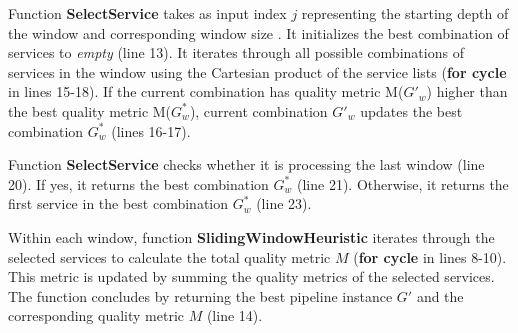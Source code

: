 Function \textbf{SelectService} takes as input index $j$ representing the starting depth of the window and corresponding window size \windowsize. It initializes the best combination of services to \textit{empty} (line 13). It iterates through all possible combinations of services in the window using the Cartesian product of the service lists (\textbf{for cycle} in lines 15-18). If the current combination has quality metric M($G'_w$) higher than the best quality metric M($G^*_w$), current combination $G'_w$ updates the best combination $G^*_w$ (lines 16-17).

Function \textbf{SelectService} checks whether it is processing the last window (line 20). If yes, it returns the best combination $G^*_w$ (line 21). Otherwise, it returns the first service in the best combination $G^*_w$ (line 23).

Within each window, function \textbf{SlidingWindowHeuristic} iterates through the selected services to calculate the total quality metric $M$ (\textbf{for cycle} in lines 8-10). This metric is updated by summing the quality metrics of the selected services. The function concludes by returning the best pipeline instance $G'$ and the corresponding quality metric $M$ (line 14).


